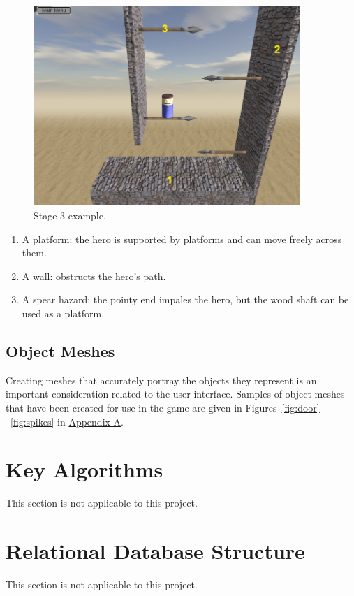 \documentclass[12pt, titlepage]{article}
\begin{document}
\begin{figure}[hTB]
\begin{center}
\includegraphics[width=0.90\textwidth]{stage3}
\caption{Stage 3 example.} \label{fig:stage3}
\end{center}
\end{figure}


\begin{enumerate}
  \item A platform:  the hero is supported by platforms and can move freely across them.
  \item A wall:  obstructs the hero's path.
  \item A spear hazard:  the pointy end impales the hero, but the wood shaft can be used as a platform.
\end{enumerate}

\subsection{Object Meshes}
Creating meshes that accurately portray the objects they represent is an important consideration related to the user interface.   Samples of object meshes that have been created for use in the game are given in Figures~\ref*{fig:door}~-~\ref*{fig:spikes} in \hyperref[sec:app]{Appendix A}.


\section{Key Algorithms}
This section is not applicable to this project.

\section{Relational Database Structure}
This section is not applicable to this project.
\end{document}
